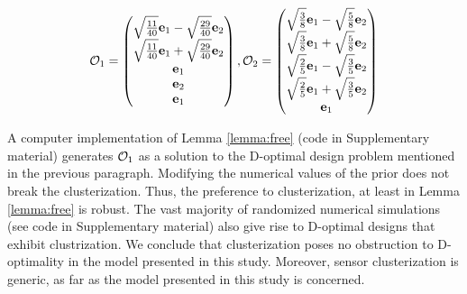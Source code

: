 \begin{equation}\label{eq:two designs}
  \obs_1 =
  \begin{pmatrix}
    \sqrt{\frac{11}{40}}\ev_1 - \sqrt{\frac{29}{40}}\ev_2 \\
    \sqrt{\frac{11}{40}}\ev_1 + \sqrt{\frac{29}{40}}\ev_2 \\
    \ev_1 \\
    \ev_2 \\
    \ev_1 \\    
  \end{pmatrix},
  \obs_2 =
  \begin{pmatrix}
    \sqrt{\frac{3}{8}}\ev_1 - \sqrt{\frac{5}{8}}\ev_2 \\
    \sqrt{\frac{3}{8}}\ev_1 + \sqrt{\frac{5}{8}}\ev_2 \\
    \sqrt{\frac{2}{5}}\ev_1 - \sqrt{\frac{3}{5}}\ev_2 \\
    \sqrt{\frac{2}{5}}\ev_1 + \sqrt{\frac{3}{5}}\ev_2 \\
    \ev_1 \\    
  \end{pmatrix}
\end{equation}

A computer implementation of Lemma \ref{lemma:free} (code in
Supplementary material) generates $\mathcal{O}_1$ as a solution to the
D-optimal design problem mentioned in the previous
paragraph. Modifying the numerical values of the prior does not break
the clusterization. Thus, the preference to clusterization, at least
in Lemma \ref{lemma:free} is robust. The vast majority of randomized
numerical simulations (see code in Supplementary material) also give
rise to D-optimal designs that exhibit clustrization. We conclude that
clusterization poses no obstruction to D-optimality in the model
presented in this study. Moreover, sensor clusterization is generic,
as far as the model presented in this study is concerned.


\clusterization



